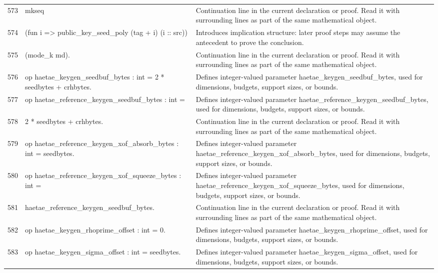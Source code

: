 \documentclass[10pt]{article}
\begin{document}
\begin{longtable}{r L{0.53\textwidth} L{0.37\textwidth}}
573 & {\ttfamily\scriptsize   mkseq} & Continuation line in the current declaration or proof.  Read it with surrounding lines as part of the same mathematical object. \\
574 & {\ttfamily\scriptsize     (fun i => public\_key\_seed\_poly (tag + i) (i :: src))} & Introduces implication structure: later proof steps may assume the antecedent to prove the conclusion. \\
575 & {\ttfamily\scriptsize     (mode\_k md).} & Continuation line in the current declaration or proof.  Read it with surrounding lines as part of the same mathematical object. \\
576 & {\ttfamily\scriptsize op haetae\_keygen\_seedbuf\_bytes : int = 2 * seedbytes + crhbytes.} & Defines integer-valued parameter haetae\_keygen\_seedbuf\_bytes, used for dimensions, budgets, support sizes, or bounds. \\
577 & {\ttfamily\scriptsize op haetae\_reference\_keygen\_seedbuf\_bytes : int =} & Defines integer-valued parameter haetae\_reference\_keygen\_seedbuf\_bytes, used for dimensions, budgets, support sizes, or bounds. \\
578 & {\ttfamily\scriptsize   2 * seedbytes + crhbytes.} & Continuation line in the current declaration or proof.  Read it with surrounding lines as part of the same mathematical object. \\
579 & {\ttfamily\scriptsize op haetae\_reference\_keygen\_xof\_absorb\_bytes : int = seedbytes.} & Defines integer-valued parameter haetae\_reference\_keygen\_xof\_absorb\_bytes, used for dimensions, budgets, support sizes, or bounds. \\
580 & {\ttfamily\scriptsize op haetae\_reference\_keygen\_xof\_squeeze\_bytes : int =} & Defines integer-valued parameter haetae\_reference\_keygen\_xof\_squeeze\_bytes, used for dimensions, budgets, support sizes, or bounds. \\
581 & {\ttfamily\scriptsize   haetae\_reference\_keygen\_seedbuf\_bytes.} & Continuation line in the current declaration or proof.  Read it with surrounding lines as part of the same mathematical object. \\
582 & {\ttfamily\scriptsize op haetae\_keygen\_rhoprime\_offset : int = 0.} & Defines integer-valued parameter haetae\_keygen\_rhoprime\_offset, used for dimensions, budgets, support sizes, or bounds. \\
583 & {\ttfamily\scriptsize op haetae\_keygen\_sigma\_offset : int = seedbytes.} & Defines integer-valued parameter haetae\_keygen\_sigma\_offset, used for dimensions, budgets, support sizes, or bounds. \\

\end{longtable}
\end{document}
